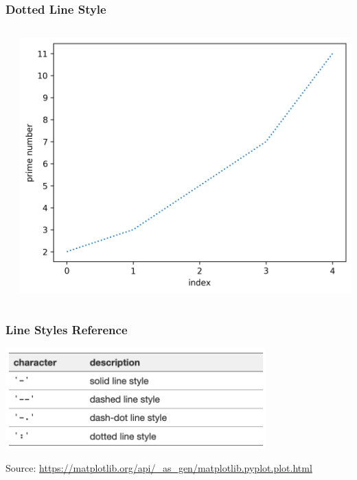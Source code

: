 \documentclass[xcolor={svgnames}]{beamer}
\newcommand{\pyfile}[2][]{}
\begin{document}
\begin{frame}[t,fragile]
    \frametitle{Dotted Line Style}
    \vspace{5mm}
    \begin{columns}[T]
        \begin{column}{0.52\textwidth}
            \pyfile{examples/14-dotted-line-style.py}
        \end{column}
        \begin{column}{0.48\textwidth}
            \includegraphics[width=\textwidth]{img/14-dotted-line-style.png}
        \end{column}
    \end{columns}
\end{frame}


\begin{frame}[t,fragile]
    \frametitle{Line Styles Reference}
    \vspace{5mm}
    \includegraphics[width=0.75\textwidth]{img/ref-line-styles.png}

    \bigskip

    \footnotesize

    \hspace{0.2mm}
    Source:
    \url{https://matplotlib.org/api/_as_gen/matplotlib.pyplot.plot.html}
\end{frame}
\end{document}
